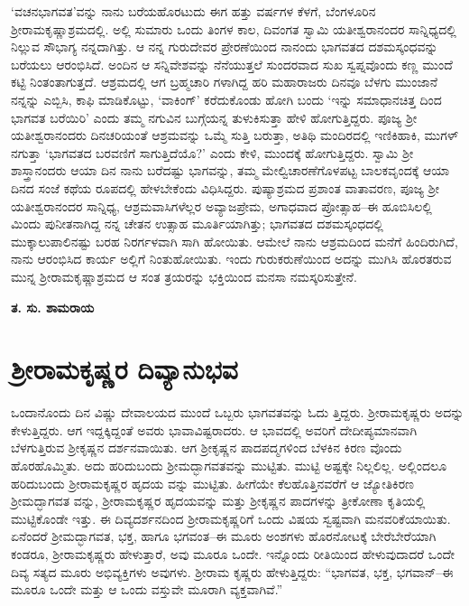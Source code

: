 ‘ವಚನಭಾಗವತ’ವನ್ನು ನಾನು ಬರೆಯಹೊರಟುದು ಈಗ ಹತ್ತು ವರ್ಷಗಳ ಕೆಳಗೆ, ಬೆಂಗಳೂರಿನ ಶ್ರೀರಾಮಕೃಷ್ಣಾಶ್ರಮದಲ್ಲಿ. ಅಲ್ಲಿ ಸುಮಾರು ಒಂದು ತಿಂಗಳ ಕಾಲ, ದಿವಂಗತ ಸ್ವಾಮಿ ಯತೀಶ್ವರಾನಂದರ ಸಾನ್ನಿಧ್ಯದಲ್ಲಿ ನಿಲ್ಲುವ ಸೌಭಾಗ್ಯ ನನ್ನದಾಗಿತ್ತು. ಆ ನನ್ನ ಗುರುದೇವರ ಪ್ರೇರಣೆಯಿಂದ ನಾನಂದು ಭಾಗವತದ ದಶಮಸ್ಕಂಧವನ್ನು ಬರೆಯಲು ಆರಂಭಿಸಿದೆ. ಅಂದಿನ ಆ ಸನ್ನಿವೇಶವನ್ನು ನೆನೆಯುತ್ತಲೆ ಸುಂದರವಾದ ಸುಖ ಸ್ವಪ್ನವೊಂದು ಕಣ್ಣ ಮುಂದೆ ಕಟ್ಟಿ ನಿಂತಂತಾಗುತ್ತದೆ. ಆಶ್ರಮದಲ್ಲಿ ಆಗ ಬ್ರಹ್ಮಚಾರಿ ಗಳಾಗಿದ್ದ ಹರಿ ಮಹಾರಾಜರು ದಿನವೂ ಬೆಳಗು ಮುಂಜಾನೆ ನನ್ನನ್ನು ಎಬ್ಬಿಸಿ, ಕಾಫಿ ಮಾಡಿಕೊಟ್ಟು, ‘ವಾಕಿಂಗ್​’ ಕರೆದುಕೊಂಡು ಹೋಗಿ ಬಂದು ‘ಇನ್ನು ಸಮಾಧಾನಚಿತ್ತ ದಿಂದ ಭಾಗವತ ಬರೆಯಿರಿ’ ಎಂದು ತಮ್ಮ ನಗುವಿನ ಬುಗ್ಗೆಯನ್ನ ತುಳುಕಿಸುತ್ತಾ ಹೇಳಿ ಹೋಗುತ್ತಿದ್ದರು. ಪೂಜ್ಯ ಶ್ರೀ ಯತೀಶ್ವರಾನಂದರು ದಿನಚರಿಯಂತೆ ಆಶ್ರಮವನ್ನು ಒಮ್ಮೆ ಸುತ್ತಿ ಬರುತ್ತಾ, ಅತಿಥಿ ಮಂದಿರದಲ್ಲಿ ಇಣಿಕಿಹಾಕಿ, ಮುಗಳ್​ನಗುತ್ತಾ ‘ಭಾಗವತದ ಬರವಣಿಗೆ ಸಾಗುತ್ತಿದೆಯೊ?’ ಎಂದು ಕೇಳಿ, ಮುಂದಕ್ಕೆ ಹೋಗುತ್ತಿದ್ದರು. ಸ್ವಾಮಿ ಶ್ರೀ ಶಾಸ್ತ್ರಾನಂದರು ಆಯಾ ದಿನ ನಾನು ಬರೆದಷ್ಟು ಭಾಗವನ್ನು, ತಮ್ಮ ಮೇಲ್ವಿಚಾರಣೆಗೊಳಪಟ್ಟ ಬಾಲಕವೃಂದಕ್ಕೆ ಆಯಾ ದಿನದ ಸಂಜೆ ಕಥೆಯ ರೂಪದಲ್ಲಿ ಹೇಳಬೇಕೆಂದು ವಿಧಿಸಿದ್ದರು. ಪುಷ್ಯಾಶ್ರಮದ ಪ್ರಶಾಂತ ವಾತಾವರಣ, ಪೂಜ್ಯ ಶ್ರೀ ಯತೀಶ್ವರಾನಂದರ ಸಾನ್ನಿಧ್ಯ, ಆಶ್ರಮವಾಸಿಗಳೆಲ್ಲರ ಅವ್ಯಾಜಪ್ರೇಮ, ಅಗಾಧವಾದ ಪ್ರೋತ್ಸಾಹ–ಈ ಹೂಬಿಸಿಲಲ್ಲಿ ಮಿಂದು ಪುನೀತನಾಗಿದ್ದ ನನ್ನ ಚೇತನ ಉತ್ಸಾಹ ಮೂರ್ತಿಯಾಗಿತ್ತು; ಭಾಗವತದ ದಶಮಸ್ಕಂಧದಲ್ಲಿ ಮುಕ್ಕಾಲುಪಾಲಿನಷ್ಟು ಬರಹ ನಿರರ್ಗಳವಾಗಿ ಸಾಗಿ ಹೋಯಿತು. ಆಮೇಲೆ ನಾನು ಆಶ್ರಮದಿಂದ ಮನೆಗೆ ಹಿಂದಿರುಗಿದೆ, ನಾನು ಆರಂಭಿಸಿದ ಕಾರ್ಯ ಅಲ್ಲಿಗೆ ನಿಂತುಹೋಯಿತು. ಇಂದು ಗುರುಕರುಣೆಯಿಂದ ಅದನ್ನು ಮುಗಿಸಿ ಹೊರತರುವ ಮುನ್ನ ಶ್ರೀರಾಮಕೃಷ್ಣಾಶ್ರಮದ ಆ ಸಂತ ತ್ರಯರನ್ನು ಭಕ್ತಿಯಿಂದ ಮನಸಾ ನಮಸ್ಕರಿಸುತ್ತೇನೆ.

\begin{flushright}
\textbf{ತ. ಸು. ಶಾಮರಾಯ}
\end{flushright}

\chapter*{ಶ್ರೀರಾಮಕೃಷ್ಣರ ದಿವ್ಯಾನುಭವ}

ಒಂದಾನೊಂದು ದಿನ ವಿಷ್ಣು ದೇವಾಲಯದ ಮುಂದೆ ಒಬ್ಬರು ಭಾಗವತವನ್ನು ಓದು ತ್ತಿದ್ದರು. ಶ್ರೀರಾಮಕೃಷ್ಣರು ಅದನ್ನು ಕೇಳುತ್ತಿದ್ದರು. ಆಗ ಇದ್ದಕ್ಕಿದ್ದಂತೆ ಅವರು ಭಾವಾವಿಷ್ಟರಾದರು. ಆ ಭಾವದಲ್ಲಿ ಅವರಿಗೆ ದೇದೀಪ್ಯಮಾನವಾಗಿ ಬೆಳಗುತ್ತಿರುವ ಶ್ರೀಕೃಷ್ಣನ ದರ್ಶನವಾಯಿತು. ಆಗ ಶ್ರೀಕೃಷ್ಣನ ಪಾದಪದ್ಮಗಳಿಂದ ಬೆಳಕಿನ ಕಿರಣ ವೊಂದು ಹೊರಹೊಮ್ಮಿತು. ಅದು ಹರಿದುಬಂದು ಶ್ರೀಮದ್ಭಾಗವತವನ್ನು ಮುಟ್ಟಿತು. ಮುಟ್ಟಿ ಅಷ್ಟಕ್ಕೇ ನಿಲ್ಲಲಿಲ್ಲ. ಅಲ್ಲಿಂದಲೂ ಹರಿದುಬಂದು ಶ್ರೀರಾಮಕೃಷ್ಣರ ಹೃದಯ ವನ್ನು ಮುಟ್ಟಿತು. ಹೀಗೆಯೇ ಕೆಲಹೊತ್ತಿನವರೆಗೆ ಆ ಜ್ಯೋತಿಕಿರಣ ಶ್ರೀಮದ್ಭಾಗವತ ವನ್ನು, ಶ್ರೀರಾಮಕೃಷ್ಣರ ಹೃದಯವನ್ನು ಮತ್ತು ಶ್ರೀಕೃಷ್ಣನ ಪಾದಗಳನ್ನು ತ್ರೀಕೋಣಾ ಕೃತಿಯಲ್ಲಿ ಮುಟ್ಟಿಕೊಂಡೇ ಇತ್ತು. ಈ ದಿವ್ಯದರ್ಶನದಿಂದ ಶ್ರೀರಾಮಕೃಷ್ಣರಿಗೆ ಒಂದು ವಿಷಯ ಸ್ವಷ್ಟವಾಗಿ ಮನವರಿಕೆಯಾಯಿತು. ಏನೆಂದರೆ ಶ್ರೀಮದ್ಭಾಗವತ, ಭಕ್ತ, ಹಾಗೂ ಭಗವಂತ–ಈ ಮೂರು ಅಂಶಗಳು ಹೊರನೋಟಕ್ಕೆ ಬೇರೆಬೇರೆಯಾಗಿ ಕಂಡರೂ, ಶ್ರೀರಾಮಕೃಷ್ಣರು ಹೇಳುತ್ತಾರೆ, ಅವು ಮೂರೂ ಒಂದೇ. ಇನ್ನೊಂದು ರೀತಿಯಿಂದ ಹೇಳುವುದಾದರೆ ಒಂದೇ ದಿವ್ಯ ಸತ್ಯದ ಮೂರು ಅಭಿವ್ಯಕ್ತಿಗಳು ಅವುಗಳು. ಶ್ರೀರಾಮ ಕೃಷ್ಣರು ಹೇಳುತ್ತಿದ್ದರು: “ಭಾಗವತ, ಭಕ್ತ, ಭಗವಾನ್​–ಈ ಮೂರೂ ಒಂದೇ ಮತ್ತು ಆ ಒಂದು ವಸ್ತುವೇ ಮೂರಾಗಿ ವ್ಯಕ್ತವಾಗಿವೆ.”

